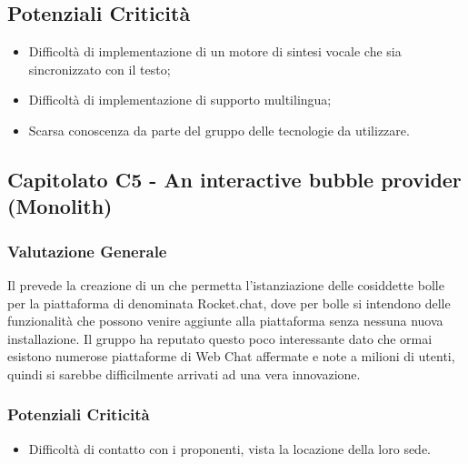 \subsection{Potenziali Criticità}
 \begin{itemize}
 \item Difficoltà di implementazione di un motore di sintesi vocale che sia sincronizzato con il testo;
 \item Difficoltà di implementazione di supporto multilingua;
 \item Scarsa conoscenza da parte del gruppo delle tecnologie da utilizzare.
 \end{itemize}
    
\subsection{Capitolato C5 - An interactive bubble provider (Monolith)}
    \subsubsection{Valutazione Generale}
    Il  prevede la creazione di un  che permetta l'istanziazione delle cosiddette bolle per la piattaforma di  denominata Rocket.chat, dove per bolle si intendono delle funzionalità che possono venire aggiunte alla piattaforma senza nessuna nuova installazione.
    Il gruppo ha reputato questo  poco interessante dato che ormai esistono numerose piattaforme di Web Chat affermate e note a milioni di utenti, quindi si sarebbe difficilmente arrivati ad una vera innovazione.
    \subsubsection{Potenziali Criticità}
    \begin{itemize}
     \item Difficoltà di contatto con i proponenti, vista la locazione della loro sede.    
    \end{itemize}
 